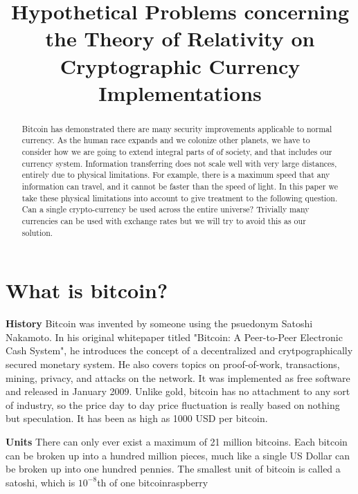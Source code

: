 \documentclass[conference]{IEEEtran}
\begin{document}
\title{Hypothetical Problems concerning the Theory of Relativity on Cryptographic Currency Implementations}
\author
{
}
\maketitle

\begin{abstract}
Bitcoin has demonstrated there are many security improvements applicable to normal currency. As the human race expands and we colonize other planets, we have to consider how we are going to extend integral parts of of society, and that includes our currency system. Information transferring does not scale well with very large distances, entirely due to physical limitations. For example, there is a maximum speed that any information can travel, and it cannot be faster than the speed of light. In this paper we take these physical limitations into account to give treatment to the following question. Can a single crypto-currency be used across the entire universe? Trivially many currencies can be used with exchange rates but we will try to avoid this as our solution. 
\end{abstract}

\section{What is bitcoin?}
\textbf{History} Bitcoin was invented by someone using the psuedonym Satoshi Nakamoto. In his original whitepaper titled "Bitcoin: A Peer-to-Peer Electronic Cash System", he introduces the concept of a decentralized and crytpographically secured monetary system. He also covers topics on proof-of-work, transactions, mining, privacy, and attacks on the network.\cite{nakamoto} It was implemented as free software and released in January 2009. Unlike gold, bitcoin has no attachment to any sort of industry, so the price day to day price fluctuation is really based on nothing but speculation. It has been as high as 1000 USD per bitcoin.\cite{1000usd}

\textbf{Units} There can only ever exist a maximum of 21 million bitcoins. Each bitcoin can be broken up into a hundred million pieces, much like a single US Dollar can be broken up into one hundred pennies. The smallest unit of bitcoin is called a satoshi, which is $10^{-8}$th of one bitcoinraspberry
\end{document}
